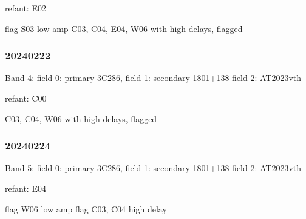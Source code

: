 \documentclass[twocolumn,twocolappendix]{aastex631}
\begin{document}
refant: E02

flag S03 low amp
C03, C04, E04, W06 with high delays, flagged


\subsubsection{20240222}

Band 4:
field 0: primary 3C286,
field 1: secondary 1801+138
field 2: AT2023vth

refant: C00

C03, C04, W06 with high delays, flagged


\subsubsection{20240224}

Band 5:
field 0: primary 3C286,
field 1: secondary 1801+138
field 2: AT2023vth

refant: E04

flag W06 low amp
flag C03, C04 high delay

%
%
       
\end{document}

